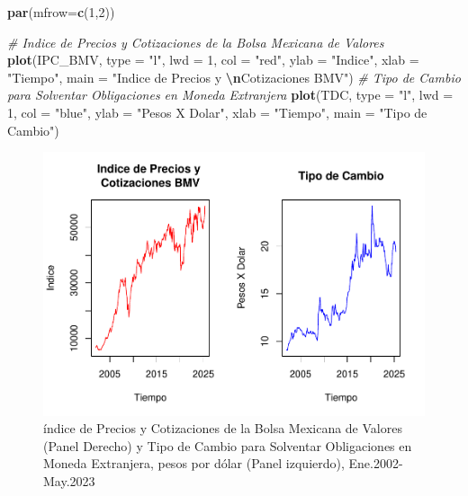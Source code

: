 \documentclass[
]{book}
\newenvironment{Shaded}{\begin{snugshade}}{\end{snugshade}}
\newcommand{\AttributeTok}[1]{\textcolor[rgb]{0.13,0.29,0.53}{#1}}
\newcommand{\CommentTok}[1]{\textcolor[rgb]{0.56,0.35,0.01}{\textit{#1}}}
\newcommand{\DecValTok}[1]{\textcolor[rgb]{0.00,0.00,0.81}{#1}}
\newcommand{\FunctionTok}[1]{\textcolor[rgb]{0.13,0.29,0.53}{\textbf{#1}}}
\newcommand{\NormalTok}[1]{#1}
\newcommand{\SpecialCharTok}[1]{\textcolor[rgb]{0.81,0.36,0.00}{\textbf{#1}}}
\newcommand{\StringTok}[1]{\textcolor[rgb]{0.31,0.60,0.02}{#1}}
\begin{document}
\begin{Shaded}
\begin{Highlighting}[]
\FunctionTok{par}\NormalTok{(}\AttributeTok{mfrow=}\FunctionTok{c}\NormalTok{(}\DecValTok{1}\NormalTok{,}\DecValTok{2}\NormalTok{))}

\CommentTok{\# Indice de Precios y Cotizaciones de la Bolsa Mexicana de Valores}
\FunctionTok{plot}\NormalTok{(IPC\_BMV, }\AttributeTok{type =} \StringTok{"l"}\NormalTok{, }\AttributeTok{lwd =} \DecValTok{1}\NormalTok{, }\AttributeTok{col =} \StringTok{"red"}\NormalTok{, }\AttributeTok{ylab =} \StringTok{"Indice"}\NormalTok{, }
     \AttributeTok{xlab =} \StringTok{"Tiempo"}\NormalTok{, }\AttributeTok{main =} \StringTok{"Indice de Precios y }\SpecialCharTok{\textbackslash{}n}\StringTok{Cotizaciones BMV"}\NormalTok{)}
\CommentTok{\# Tipo de Cambio para Solventar Obligaciones en Moneda Extranjera}
\FunctionTok{plot}\NormalTok{(TDC, }\AttributeTok{type =} \StringTok{"l"}\NormalTok{, }\AttributeTok{lwd =} \DecValTok{1}\NormalTok{, }\AttributeTok{col =} \StringTok{"blue"}\NormalTok{, }\AttributeTok{ylab =} \StringTok{"Pesos X Dolar"}\NormalTok{, }
     \AttributeTok{xlab =} \StringTok{"Tiempo"}\NormalTok{, }\AttributeTok{main =} \StringTok{"Tipo de Cambio"}\NormalTok{)}
\end{Highlighting}
\end{Shaded}

\begin{figure}

{\centering \includegraphics{Notas-Series-Tiempo_files/figure-latex/fig3-1} 

}

\caption{índice de Precios y Cotizaciones de la Bolsa Mexicana de Valores (Panel Derecho) y Tipo de Cambio para Solventar Obligaciones en Moneda Extranjera, pesos por dólar (Panel izquierdo), Ene.2002-May.2023}\label{fig:fig3}
\end{figure}
\end{document}
